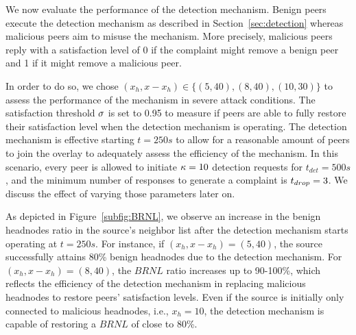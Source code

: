 

We now evaluate the performance of the detection mechanism.
Benign peers execute the detection mechanism as described in Section~\ref{sec:detection} whereas malicious peers aim to misuse the mechanism.
More precisely, malicious peers reply with a satisfaction level of 0 if the complaint might remove a benign peer and 1 if it might remove a malicious peer. 

In order to do so, we chose $(x_h, x-x_h) \in \{(5, 40), (8, 40), (10, 30)\}$ to assess the performance of the mechanism in severe attack conditions.
The satisfaction threshold $\sigma$ is set to 0.95 to measure if peers are able to fully restore their satisfaction level when the detection mechanism is operating.
The detection mechanism is effective starting $t=250s$ to allow for a reasonable amount of peers to join the overlay to adequately assess the efficiency of the mechanism.
In this scenario, every peer is allowed to initiate $\kappa=10$ detection requests for $t_{det}=500s$, and the minimum number of responses to generate a complaint is $t_{drop}=3$. 
We discuss the effect of varying those parameters later on.

As depicted in Figure~\ref{subfig:BRNL}, we observe an increase in the benign headnodes ratio in the source's neighbor list after the detection mechanism starts operating at $t=250s$.  
For instance, if $(x_h, x-x_h)=(5, 40)$, the source successfully attains 80\% benign headnodes due to the detection mechanism.
For $(x_h, x-x_h)=(8, 40)$, the $BRNL$ ratio increases up to 90-100\%, which reflects the efficiency of the detection mechanism in replacing malicious headnodes to restore peers' satisfaction levels. 
Even if the source is initially only connected to malicious headnodes, i.e., $x_h=10$, the detection mechanism is capable of restoring a $BRNL$ of close to 80\%. 

